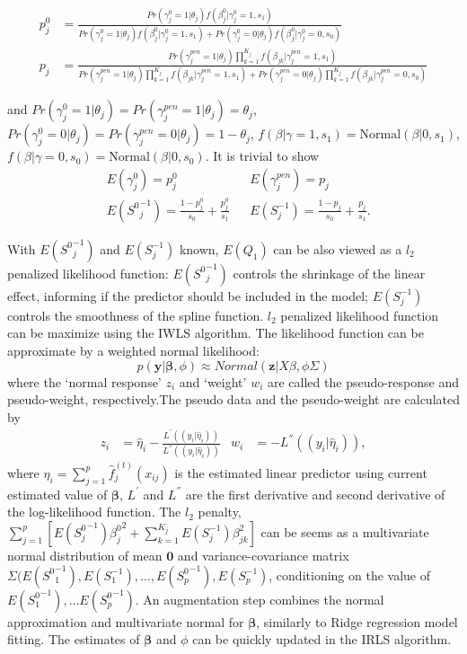 \documentclass[AMA,STIX1COL,]{WileyNJD-v2}
\begin{document}
\[
\begin{aligned}
p_{j}^0 &= \frac{Pr(\gamma_{j}^0 = 1|\theta_j)f(\beta_{j}^0|\gamma_{j}^0=1, s_1) }{Pr(\gamma_{j}^0 = 1|\theta_j)f(\beta_{j}^0|\gamma_{j}^0=1, s_1) + Pr(\gamma_{j}^0 = 0|\theta_j)f(\beta^0_{j}|\gamma^0_{j}=0, s_0)}\\
p_{j} &= \frac{Pr(\gamma^{pen}_{j} = 1|\theta_j)\prod\limits_{k=1}^{K_j}f(\beta_{jk}|\gamma^{pen}_{j}=1, s_1) }{Pr(\gamma^{pen}_{j} = 1|\theta_j)\prod\limits_{k=1}^{K_j}f(\beta_{jk}|\gamma^{pen}_{j}=1, s_1) + Pr(\gamma^{pen}_{j} = 0|\theta_j)\prod\limits_{k=1}^{K_j}f(\beta_{jk}|\gamma^{pen}_{j}=0, s_0)}
\end{aligned}
\]

and
\(Pr(\gamma_{j}^{0} = 1|\theta_j) =Pr(\gamma_{j}^{pen} = 1|\theta_j) = \theta_j\),
\(Pr(\gamma_{j}^{0} = 0|\theta_j) = Pr(\gamma_{j}^{pen} = 0|\theta_j) = 1-\theta_j\),
\(f(\beta|\gamma=1, s_1) = \text{Normal}(\beta|0 , s_1)\),
\(f(\beta|\gamma=0, s_0) = \text{Normal}(\beta|0 , s_0)\). It is trivial
to show \[
\begin{aligned}
&E(\gamma^0_{j})  = p^0_{j} & &E(\gamma^{pen}_{j})  = p_{j}\\
&E({S^0}^{-1}_{j}) = \frac{1-p^{0}_{j}}{s_0} + \frac{p^{0}_{j}}{s_1} & &E(S^{-1}_{j}) = \frac{1-p_{j}}{s_0} + \frac{p_{j}}{s_1}.
\end{aligned}
\]

With \(E({S^0}^{-1}_{j})\) and \(E(S^{-1}_{j})\) known, \(E(Q_1)\) can
be also viewed as a \(l_2\) penalized likelihood function:
\(E({S^0}^{-1}_{j})\) controls the shrinkage of the linear effect,
informing if the predictor should be included in the model;
\(E(S^{-1}_{j})\) controls the smoothness of the spline function.
\(l_2\) penalized likelihood function can be maximize using the IWLS
algorithm. The likelihood function can be approximate by a weighted
normal likelihood: \[
  p(\textbf{y}|\boldsymbol{\beta}, \phi) \approx Normal(\textbf{z}|X\beta, \phi\Sigma)
\] where the `normal response' \(z_i\) and `weight' \(w_i\) are called
the pseudo-response and pseudo-weight, respectively.The pseudo data and
the pseudo-weight are calculated by \[
    \begin{aligned}
    z_i &= \hat\eta_i - \frac{L^{'}((y_i|\hat\eta_i))}{L^{''}((y_i|\hat\eta_i))}& w_i &= - L^{''}((y_i|\hat\eta_i)),
    \end{aligned}
    \] where \(\eta_i = \sum\limits_{j=1}^p \hat f_j^{(t)}(x_{ij})\) is
the estimated linear predictor using current estimated value of
\(\boldsymbol{\beta}\), \(L^{'}\) and \(L^{''}\) are the first
derivative and second derivative of the log-likelihood function. The
\(l_2\) penalty,
\(\sum\limits_{j=1}^{p}\left[E({S^0_j}^{-1}){\beta^0_j}^2+\sum\limits_{k=1}^{K_j}E(S^{-1}_{j})\beta_{jk}^2\right]\)
can be seems as a multivariate normal distribution of mean
\(\textbf{0}\) and variance-covariance matrix
\(\Sigma(E({S^0}_1^{-1}), E(S_1^{-1}), \dots, E({S_p^0}^{-1}), E(S_p^{-1})\),
conditioning on the value of \(E({S^0_1}^{-1}), \dots E({S^0_p}^{-1})\).
An augmentation step combines the normal approximation and multivariate
normal for \(\boldsymbol{\beta}\), similarly to Ridge regression model
fitting. The estimates of \(\boldsymbol{\beta}\) and \(\phi\) can be
quickly updated in the IRLS algorithm.
\end{document}
